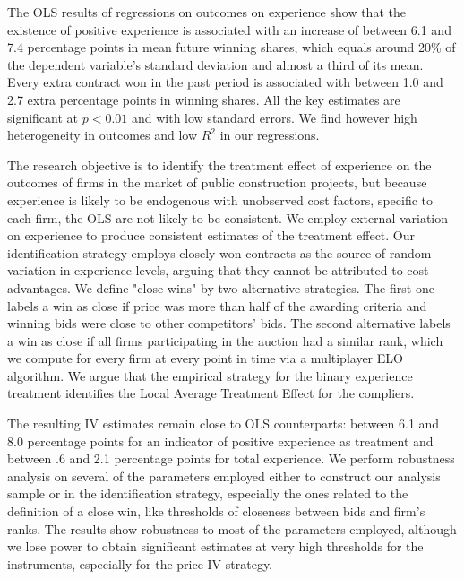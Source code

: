 
The OLS results of regressions on outcomes on experience show that the existence of positive experience is associated with an increase of between 6.1 and 7.4 percentage points in mean future winning shares, which equals around 20\% of the dependent variable's standard deviation and almost a third of its mean. Every extra contract won in the past period is associated with between 1.0 and 2.7 extra percentage points in winning shares. All the key estimates are significant at $p<0.01$ and with low standard errors. We find however high heterogeneity in outcomes and low $R^2$ in our regressions.

 The research objective is to identify the treatment effect of experience on the outcomes of firms in the market of public construction projects, but because experience is likely to be endogenous with unobserved cost factors, specific to each firm, the OLS are not likely to be consistent. We employ external variation on experience to produce consistent estimates of the treatment effect. Our identification strategy employs closely won contracts as the source of random variation in experience levels, arguing that they cannot be attributed to cost advantages. We define "close wins" by two alternative strategies. The first one labels a win as close if price was more than half of the awarding criteria and winning bids were close to other competitors' bids. The second alternative labels a win as close if all firms participating in the auction had a similar rank, which we compute for every firm at every point in time via a multiplayer ELO algorithm. We argue that the empirical strategy for the binary experience treatment identifies the Local Average Treatment Effect for the compliers.

The resulting IV estimates remain close to OLS counterparts: between 6.1 and 8.0 percentage points for an indicator of positive experience as treatment and between .6 and 2.1 percentage points for total experience. We perform robustness analysis on several of the parameters employed either to construct our analysis sample or in the identification strategy, especially the ones related to the definition of a close win, like thresholds of closeness between bids and firm's ranks. The results show robustness to most of the parameters employed, although we lose power to obtain significant estimates at very high thresholds for the instruments, especially for the price IV strategy.

